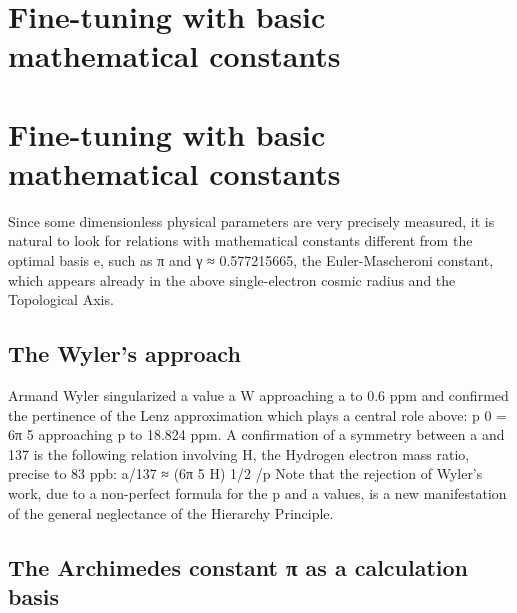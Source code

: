 \chapter{Fine-tuning with basic mathematical constants}
\label{chap:chapter_3}

\chapter{Fine-tuning with basic mathematical constants}

Since some dimensionless physical parameters are very precisely measured, it is natural to look for
relations with mathematical constants different from the optimal basis e, such as π and γ ≈
0.577215665, the Euler-Mascheroni constant, which appears already in the above single-electron
cosmic radius and the Topological Axis.

\section {The Wyler's approach}

Armand Wyler singularized a value a W approaching a to 0.6 ppm and confirmed the pertinence
of the Lenz approximation which plays a central role above: p 0 = 6π 5 approaching p to 18.824 ppm.
A confirmation of a symmetry between a and 137 is the following relation involving H, the
Hydrogen electron mass ratio, precise to 83 ppb:
a/137 ≈ (6π 5 H) 1/2 /p
Note that the rejection of Wyler's work, due to a non-perfect formula for the p and a values, is a new
manifestation of the general neglectance of the Hierarchy Principle.

\section {The Archimedes constant π as a calculation basis}

